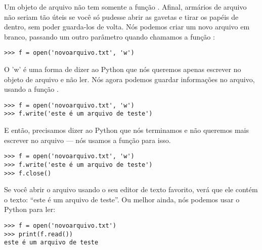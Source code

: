 Um objeto de arquivo não tem somente a função . Afinal, armários de arquivo não seriam tão úteis se você só pudesse abrir as gavetas e tirar os papéis de dentro, sem poder guarda-los de volta. Nós podemos criar um novo arquivo em branco, passando um outro parâmetro quando chamamos a função :

\begin{listing}
\begin{verbatim}
>>> f = open('novoarquivo.txt', 'w')
\end{verbatim}
\end{listing}

O 'w' é uma forma de dizer ao Python que nós queremos apenas escrever no objeto de arquivo e não ler. Nós agora podemos guardar informações no arquivo, usando a função .

\begin{listing}
\begin{verbatim}
>>> f = open('novoarquivo.txt', 'w')
>>> f.write('este é um arquivo de teste')
\end{verbatim}
\end{listing}

E então, precisamos dizer ao Python que nós terminamos e não queremos mais escrever no arquivo --- nós usamos a função  para isso.

\begin{listing}
\begin{verbatim}
>>> f = open('novoarquivo.txt', 'w')
>>> f.write('este é um arquivo de teste')
>>> f.close()
\end{verbatim}
\end{listing}

Se você abrir o arquivo usando o seu editor de texto favorito, verá que ele contém o texto: ``este é um arquivo de teste''. Ou melhor ainda, nós podemos usar o Python para ler:

\begin{listing}
\begin{verbatim}
>>> f = open('novoarquivo.txt')
>>> print(f.read())
este é um arquivo de teste
\end{verbatim}
\end{listing}

\newpage
